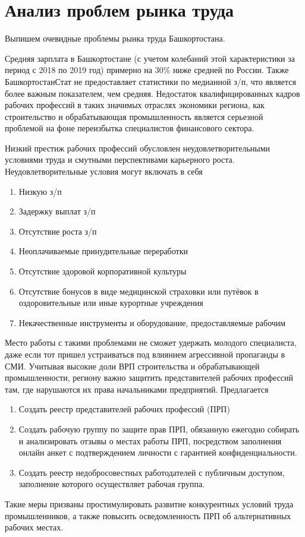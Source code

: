 \section{Анализ проблем рынка труда}

Выпишем очевидные проблемы рынка труда Башкортостана.

Средняя зарплата в Башкортостане (с учетом колебаний этой характеристики за период с 2018 по 2019 год) примерно на 30\% ниже средней по России. Также БашкортостанСтат не предоставляет статистики по медианной з/п, что является более важным показателем, чем средняя. Недостаток квалифицированных кадров рабочих профессий в таких значимых отраслях экономики региона, как строительство и обрабатывающая промышленность является серьезной проблемой на фоне переизбытка специалистов финансового сектора.

Низкий престиж рабочих профессий обусловлен неудовлетворительными условиями труда и смутными перспективами карьерного роста. Неудовлетворительные условия могут включать в себя 
\begin{enumerate}
	\item Низкую з/п
	\item Задержку выплат з/п
	\item Отсутствие роста з/п
	\item Неоплачиваемые принудительные переработки
	\item Отсутствие здоровой корпоративной культуры
	\item Отсутствие бонусов в виде медицинской страховки или путёвок в оздоровительные или иные курортные учреждения
	\item Некачественные инструменты и оборудование, предоставляемые рабочим
\end{enumerate}

Место работы с такими проблемами не сможет удержать молодого специалиста, даже если тот пришел устраиваться под влиянием агрессивной пропаганды в СМИ. Учитывая высокие доли ВРП строительства и обрабатывающей промышленности, региону важно защитить представителей рабочих профессий там, где нарушаются их права начальниками предприятий. 
Предлагается
\begin{enumerate}
	\item Создать реестр представителей рабочих профессий (ПРП)
	\item Создать рабочую группу по защите прав ПРП, обязанную ежегодно собирать и анализировать отзывы о местах работы ПРП, посредством заполнения онлайн анкет с подтверждением личности с гарантией конфиденциальности.
	\item Создать реестр недобросовестных работодателей с публичным доступом, заполнение которого осуществляет рабочая группа.
\end{enumerate}

Такие меры призваны простимулировать развитие конкурентных условий труда промышленников, а также повысить осведомленность ПРП об альтернативных рабочих местах.